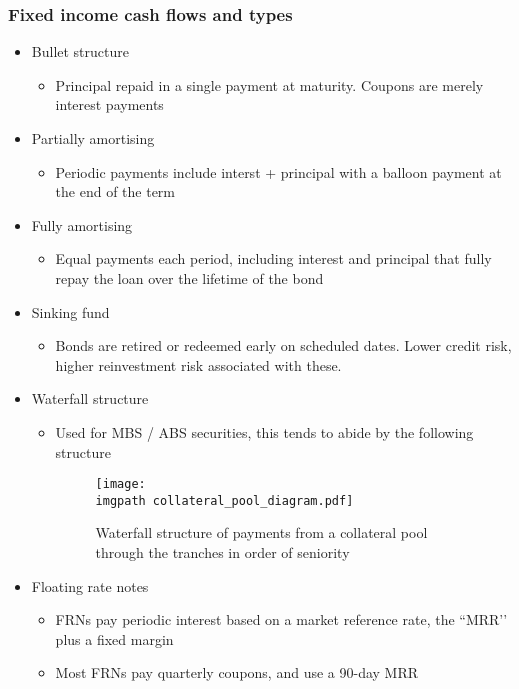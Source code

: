 \documentclass[../notes_compiled.tex]{subfiles}
\begin{document}
\subsubsection{Fixed income cash flows and types}
\begin{itemize}
\item Bullet structure
\begin{itemize}
\item Principal repaid in a single payment at maturity. Coupons are merely interest payments
\end{itemize}
\item Partially amortising
\begin{itemize}
\item Periodic payments include interst + principal with a balloon payment at the end of the term
\end{itemize}
\item Fully amortising
\begin{itemize}
\item Equal payments each period, including interest and principal that fully repay the loan over the lifetime of the bond
\end{itemize}
\item Sinking fund
\begin{itemize}
\item Bonds are retired or redeemed early on scheduled dates. Lower credit risk, higher reinvestment risk associated with these.
\end{itemize}
\item Waterfall structure
\begin{itemize}
\item Used for MBS / ABS securities, this tends to abide by the following structure
\vspace{-.4cm}
\begin{figure}[h!]
  \centering
  \texttt{[image: \\imgpath collateral\_pool\_diagram.pdf]}
  \caption{Waterfall structure of payments from a collateral pool through the tranches in order of seniority}
  \label{fig-waterfall}
\end{figure}
\vspace{-.4cm}
\end{itemize}
\item Floating rate notes
\begin{itemize}
\item FRNs pay periodic interest based on a market reference rate, the ``MRR’’ plus a fixed margin
\item Most FRNs pay quarterly coupons, and use a 90-day MRR

\end{itemize}
\end{itemize}
\end{document}
